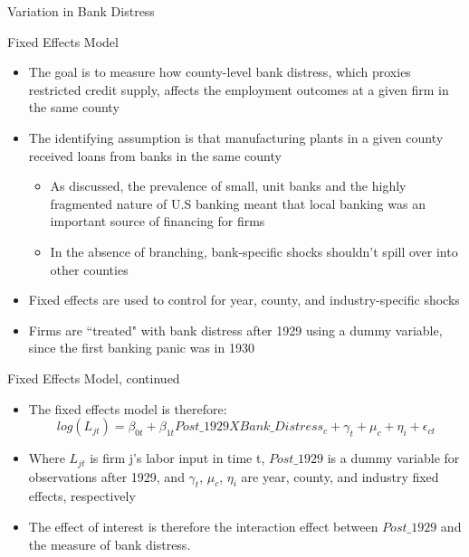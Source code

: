 \documentclass[11pt]{beamer}
\begin{document}
\begin{frame}{Variation in Bank Distress}
\begin{figure}
\end{figure}
\end{frame}

\begin{frame}{Fixed Effects Model}
\begin{itemize}
\item The goal is to measure how county-level bank distress, which proxies restricted credit supply, affects the employment outcomes at a given firm in the same county
\item The identifying assumption is that manufacturing plants in a given county received loans from banks in the same county
\begin{itemize}
\item As discussed, the prevalence of small, unit banks and the highly fragmented nature of U.S banking meant that local banking was an important source of financing for firms
\item In the absence of branching, bank-specific shocks shouldn't spill over into other counties
\end{itemize}
\item Fixed effects are used to control for year, county, and industry-specific shocks
\item Firms are ``treated" with bank distress after 1929 using a dummy variable, since the first banking panic was in 1930
\end{itemize}
\end{frame}

\begin{frame}{Fixed Effects Model, continued}
\begin{itemize}
\item The fixed effects model is therefore:
\[
log(L_{jt}) = \beta_{0t} + \beta_{1t} Post\_1929XBank\_Distress_c + \gamma_t + \mu_c +\eta_i  + \epsilon_{ct}
\]
\item Where $L_{jt}$ is firm j's labor input in time t, $Post\_1929$ is a dummy variable for observations after 1929, and $\gamma_t$, $\mu_c$, $\eta_i$ are year, county, and industry fixed effects, respectively
\item The effect of interest is therefore the interaction effect between $Post\_1929$ and the measure of bank distress.
\end{itemize}
\end{frame}
\end{document}
